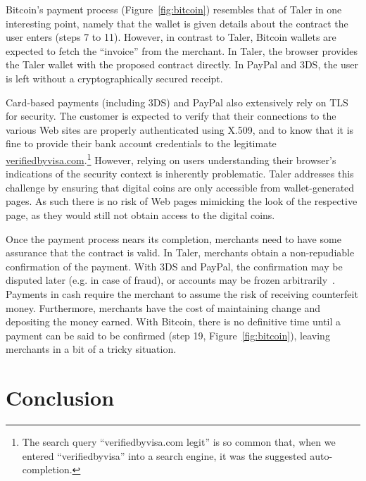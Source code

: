 \documentclass{IEEEtran}
\begin{document}
Bitcoin's payment process (Figure~\ref{fig:bitcoin}) resembles that of
Taler in one interesting point, namely that the wallet is given
details about the contract the user enters (steps 7 to 11).
However, in contrast to Taler, Bitcoin wallets are expected
to fetch the ``invoice'' from the merchant. In Taler, the browser
provides the Taler wallet with the proposed contract directly.  In
PayPal and 3DS, the user is left without a cryptographically secured
receipt.

Card-based payments (including 3DS) and PayPal also extensively rely
on TLS for security.  The customer is expected to verify that their
connections to the various Web sites are properly authenticated using
X.509, and to know that it is fine to provide their bank account
credentials to the legitimate
\url{verifiedbyvisa.com}.\footnote{The search query
``verifiedbyvisa.com legit'' is so common that, when we entered
``verifiedbyvisa'' into a search engine, it was the suggested
auto-completion.}  However, relying on users understanding their
browser's indications of the security context is inherently
problematic.  Taler addresses this challenge by ensuring that digital
coins are only accessible from wallet-generated pages. As such
there is no risk of Web pages mimicking the look of the respective
page, as they would still not obtain access to the digital coins.

Once the payment process nears its completion, merchants need to have
some assurance that the contract is valid.  In Taler, merchants
obtain a non-repudiable confirmation of the payment.  With 3DS and
PayPal, the confirmation may be disputed later (e.g. in case of
fraud), or accounts may be frozen arbitrarily~\cite{diaspora2011}.
Payments in cash require the merchant to assume the risk of receiving
counterfeit money.
Furthermore, merchants have the cost of maintaining change and depositing
the money earned.  With Bitcoin, there is no definitive time until a
payment can be said to be confirmed (step 19, Figure~\ref{fig:bitcoin}),
leaving merchants in a bit of a tricky situation.

\section{Conclusion}
\end{document}
